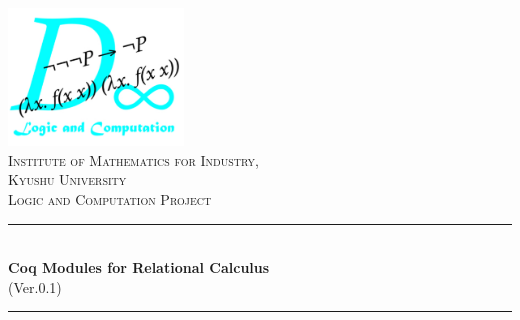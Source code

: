 \documentclass[12pt]{report}
\newcommand{\HRule}{\rule{\linewidth}{0.5mm}}
\begin{document}

\begin{titlepage}
\begin{center}
\includegraphics[width=0.35\textwidth]{./TPPLOGO.pdf}~\\[2cm]

\textsc{\Large Institute of Mathematics for Industry,} \\
\textsc{Kyushu University}\\[1.5cm]

\textsc{\Large Logic and Computation Project}\\[0.5cm]

\HRule \\[0.4cm]
{ \huge \bfseries Coq Modules for Relational Calculus }\\[0.2cm]
(Ver.0.1)\\[0.4cm]

\HRule \\[1.5cm]


\end{center}
\end{titlepage}
\end{document}
